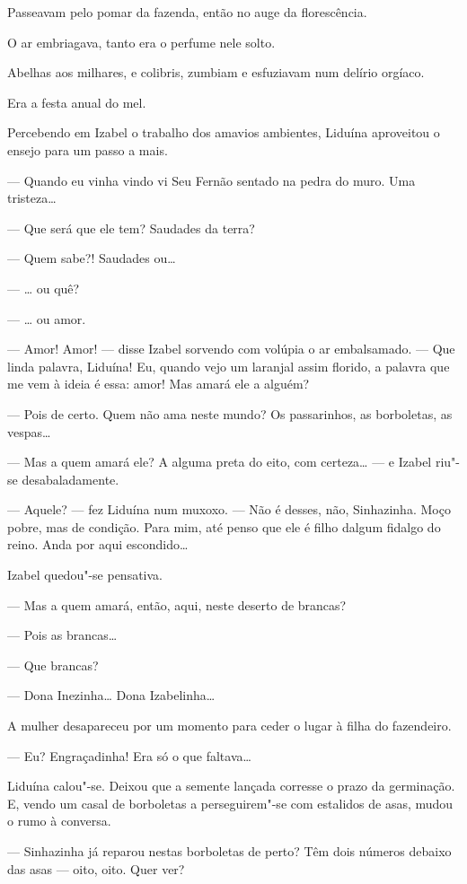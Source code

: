 Passeavam pelo pomar da fazenda, então no auge da florescência.

O ar embriagava, tanto era o perfume nele solto.

Abelhas aos milhares, e colibris, zumbiam e esfuziavam num delírio
orgíaco.

Era a festa anual do mel.

Percebendo em Izabel o trabalho dos amavios ambientes, Liduína
aproveitou o ensejo para um passo a mais.

--- Quando eu vinha vindo vi Seu Fernão sentado na pedra do muro. Uma
tristeza\ldots{}

--- Que será que ele tem? Saudades da terra?

--- Quem sabe?! Saudades ou\ldots{}

--- \ldots{} ou quê?

--- \ldots{} ou amor.

--- Amor! Amor! --- disse Izabel sorvendo com volúpia o ar embalsamado.
--- Que linda palavra, Liduína! Eu, quando vejo um laranjal assim
florido, a palavra que me vem à ideia é essa: amor! Mas amará ele a
alguém?

--- Pois de certo. Quem não ama neste mundo? Os passarinhos, as
borboletas, as vespas\ldots{}

--- Mas a quem amará ele? A alguma preta do eito, com certeza\ldots{} --- e
Izabel riu"-se desabaladamente.

--- Aquele? --- fez Liduína num muxoxo. --- Não é desses, não,
Sinhazinha. Moço pobre, mas de condição. Para mim, até penso que ele é
filho dalgum fidalgo do reino. Anda por aqui escondido\ldots{}

Izabel quedou"-se pensativa.

--- Mas a quem amará, então, aqui, neste deserto de brancas?

--- Pois as brancas\ldots{}

--- Que brancas?

--- Dona Inezinha\ldots{} Dona Izabelinha\ldots{}

A mulher desapareceu por um momento para ceder o lugar à filha do
fazendeiro.

--- Eu? Engraçadinha! Era só o que faltava\ldots{}

Liduína calou"-se. Deixou que a semente lançada corresse o prazo da
germinação. E, vendo um casal de borboletas a perseguirem"-se com
estalidos de asas, mudou o rumo à conversa.

--- Sinhazinha já reparou nestas borboletas de perto? Têm dois números
debaixo das asas --- oito, oito. Quer ver?

